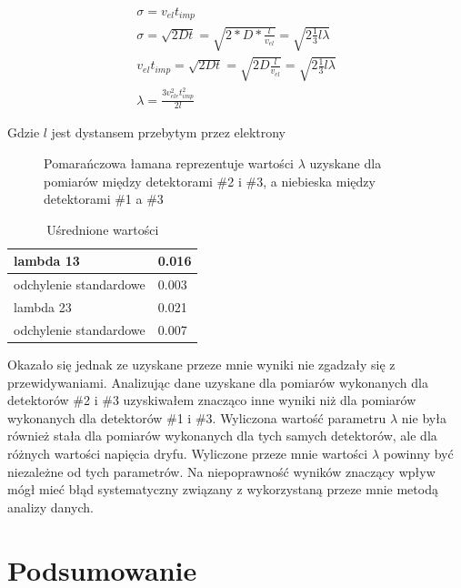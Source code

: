 \documentclass[10pt,a4paper]{article}
\begin{document}
\begin{gather*}
    \sigma = v_{el} t_{imp}\\
    \sigma = \sqrt{2Dt} = \sqrt{2*D*\frac{l}{v_{el}}} = \sqrt{2\frac{1}{3}l\lambda}\\
    v_{el} t_{imp} = \sqrt{2Dt} = \sqrt{2D\frac{l}{v_{el}}} = \sqrt{2\frac{1}{3}l\lambda}\\
    \lambda = \frac{3v^2_{ele}t^2_{imp}}{2l}
\end{gather*}

Gdzie $l$ jest dystansem przebytym przez elektrony

\begin{figure}[h]
    \centering
    \resizebox{0.9\textwidth}{!}{}
    \caption{Pomarańczowa łamana reprezentuje wartości $\lambda$ uzyskane dla pomiarów między detektorami \#2 i \#3, a niebieska między detektorami \#1 a \#3}
\end{figure}

\begin{table}[h]
    \centering
    \caption{Uśrednione wartości}
    \label{tab:my-table}
    \begin{tabular}{|l|l|}
    \hline
    lambda   13            & 0.016 \\ \hline
    odchylenie standardowe & 0.003 \\ \hline
    lambda 23              & 0.021 \\ \hline
    odchylenie standardowe & 0.007 \\ \hline
    \end{tabular}
    \end{table}

Okazało się jednak ze uzyskane przeze mnie wyniki nie zgadzały się z przewidywaniami. Analizując dane uzyskane dla pomiarów wykonanych dla detektorów \#2 i \#3 uzyskiwałem znacząco inne wyniki niż dla pomiarów wykonanych dla detektorów \#1 i \#3. Wyliczona wartość parametru $\lambda$ nie była również stała dla pomiarów wykonanych dla tych samych detektorów, ale dla różnych wartości napięcia dryfu. Wyliczone przeze mnie wartości $\lambda$ powinny być niezależne od tych parametrów. Na niepoprawność wyników znaczący wpływ mógł mieć błąd systematyczny związany z wykorzystaną przeze mnie metodą analizy danych.

\section{Podsumowanie}
\end{document}
